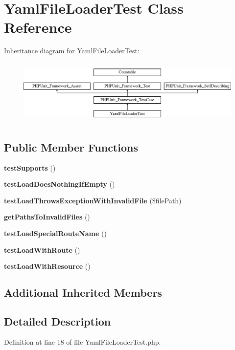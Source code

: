 \section{Yaml\+File\+Loader\+Test Class Reference}
\label{class_symfony_1_1_component_1_1_routing_1_1_tests_1_1_loader_1_1_yaml_file_loader_test}
Inheritance diagram for Yaml\+File\+Loader\+Test\+:\begin{figure}[H]
\begin{center}
\leavevmode
\includegraphics[height=3.303835cm]{class_symfony_1_1_component_1_1_routing_1_1_tests_1_1_loader_1_1_yaml_file_loader_test}
\end{center}
\end{figure}
\subsection*{Public Member Functions}
\begin{DoxyCompactItemize}
\item 
{\bf test\+Supports} ()
\item 
{\bf test\+Load\+Does\+Nothing\+If\+Empty} ()
\item 
{\bf test\+Load\+Throws\+Exception\+With\+Invalid\+File} (\$file\+Path)
\item 
{\bf get\+Paths\+To\+Invalid\+Files} ()
\item 
{\bf test\+Load\+Special\+Route\+Name} ()
\item 
{\bf test\+Load\+With\+Route} ()
\item 
{\bf test\+Load\+With\+Resource} ()
\end{DoxyCompactItemize}
\subsection*{Additional Inherited Members}


\subsection{Detailed Description}


Definition at line 18 of file Yaml\+File\+Loader\+Test.\+php.




